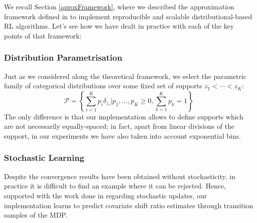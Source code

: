 \documentclass[12pt,a4paper,openright,twoside]{article}
\numberwithin{equation}{section}
\theoremstyle{definition}
\theoremstyle{remark}
\theoremstyle{plain}
\begin{document}
We recall Section \ref{aproxFramework}, where we described the approximation framework defined in \cite{analysisC51} to implement reproducible and scalable distributional-based RL algorithms. Let's see how we have dealt in practice with each of the key points of that framework:

\subsubsection*{Distribution Parametrisation}
Just as we considered along the theoretical framework, we select the parametric family of categorical distributions over some fixed set of supports $z_1 < \cdots < z_K$:
\begin{equation*}
	\mathcal{P} = \left\{ \sum_{i=1}^{K} p_i \delta_{z_i} \Big| p_1, \dots , p_K \geq 0, \sum_{k=1}^{K} p_k = 1 \right\}
\end{equation*}
The only difference is that our implementation allows to define supports which are not necessarily equally-spaced; in fact, apart from linear divisions of the support, in our experiments we have also taken into account exponential bins.


\subsubsection*{Stochastic Learning}
Despite the convergence results have been obtained without stochasticity, in practice it is difficult to find an example where it can be rejected. Hence, supported with the work done in \cite{analysisC51, DRLlinear} regarding stochastic updates, our implementation learns to predict covariate shift ratio estimates through transition samples of the MDP.
\end{document}
